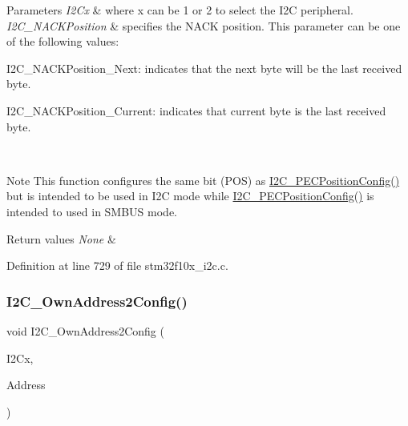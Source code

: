 \begin{DoxyParams}{Parameters}
{\em I2\+Cx} & where x can be 1 or 2 to select the I2C peripheral. \\
\hline
{\em I2\+C\+\_\+\+N\+A\+C\+K\+Position} & specifies the N\+A\+CK position. This parameter can be one of the following values\+: \begin{DoxyItemize}
\item I2\+C\+\_\+\+N\+A\+C\+K\+Position\+\_\+\+Next\+: indicates that the next byte will be the last received byte. \item I2\+C\+\_\+\+N\+A\+C\+K\+Position\+\_\+\+Current\+: indicates that current byte is the last received byte.\end{DoxyItemize}
\\
\hline
\end{DoxyParams}
\begin{DoxyNote}{Note}
This function configures the same bit (P\+OS) as \hyperlink{group___i2_c___private___functions_ga5d0f939bdd45542502827bf408f24161}{I2\+C\+\_\+\+P\+E\+C\+Position\+Config()} but is intended to be used in I2C mode while \hyperlink{group___i2_c___private___functions_ga5d0f939bdd45542502827bf408f24161}{I2\+C\+\_\+\+P\+E\+C\+Position\+Config()} is intended to used in S\+M\+B\+US mode.
\end{DoxyNote}

\begin{DoxyRetVals}{Return values}
{\em None} & \\
\hline
\end{DoxyRetVals}


Definition at line 729 of file stm32f10x\+\_\+i2c.\+c.

\mbox{\label{group___i2_c___private___functions_ga7be2cc634a613c8e3539137e897a22df}} 
\subsubsection{\texorpdfstring{I2\+C\+\_\+\+Own\+Address2\+Config()}{I2C\_OwnAddress2Config()}}
{\footnotesize\ttfamily void I2\+C\+\_\+\+Own\+Address2\+Config (\begin{DoxyParamCaption}\item[{\hyperlink{struct_i2_c___type_def}{I2\+C\+\_\+\+Type\+Def} $\ast$}]{I2\+Cx,  }\item[{uint8\+\_\+t}]{Address }\end{DoxyParamCaption})}




